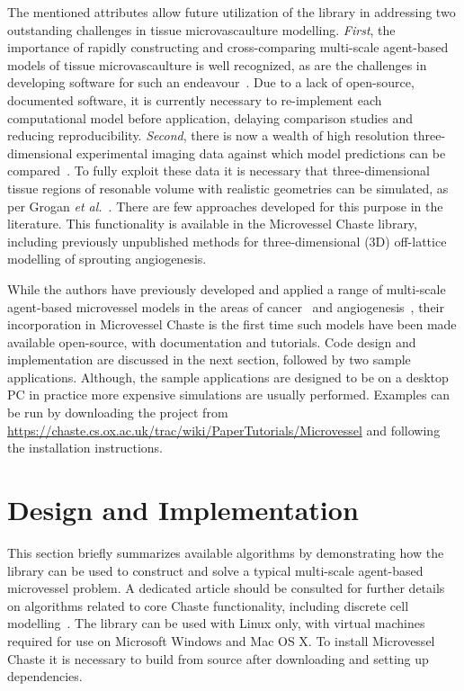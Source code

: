 \documentclass[10pt,letterpaper]{article}
\begin{document}
The mentioned attributes allow future utilization of the library in addressing two outstanding challenges in tissue microvascaulture modelling. \emph{First}, the importance of rapidly constructing and cross-comparing multi-scale agent-based models of tissue microvascaulture is well recognized, as are the challenges in developing software for such an endeavour~\cite{Rieger2015, Connor2012}. Due to a lack of open-source, documented software, it is currently necessary to re-implement each computational model before application, delaying comparison studies and reducing reproducibility. \emph{Second}, there is now a wealth of high resolution three-dimensional experimental imaging data against which model predictions can be compared~\cite{Tozer2004}. To fully exploit these data it is necessary that three-dimensional tissue regions of resonable volume with realistic geometries can be simulated, as per Grogan \emph{et al.}~\cite{Grogan2016}. There are few approaches developed for this purpose in the literature. This functionality is available in the Microvessel Chaste library, including previously unpublished methods for three-dimensional (3D) off-lattice modelling of sprouting angiogenesis.  

While the authors have previously developed and applied a range of multi-scale agent-based microvessel models in the areas of cancer~\cite{Alarcon2005, Perfahl2011, Grogan2016} and angiogenesis~\cite{Connor2015}, their incorporation in Microvessel Chaste is the first time such models have been made available open-source, with documentation and tutorials. Code design and implementation are discussed in the next section, followed by two sample applications. 	Although, the sample applications are designed to be on a desktop PC in practice more expensive simulations are usually performed. Examples can be run by downloading the project from \url{https://chaste.cs.ox.ac.uk/trac/wiki/PaperTutorials/Microvessel} and following the installation instructions. 

\section*{Design and Implementation}

This section briefly summarizes available algorithms by demonstrating how the library can be used to construct and solve a typical multi-scale agent-based microvessel problem. A dedicated article should be consulted for further details on algorithms related to core Chaste functionality, including discrete cell modelling~\cite{Mirams2013}. The library can be used with Linux only, with virtual machines required for use on Microsoft Windows and Mac OS X. To install Microvessel Chaste it is necessary to build from source after downloading and setting up dependencies. 
\end{document}
